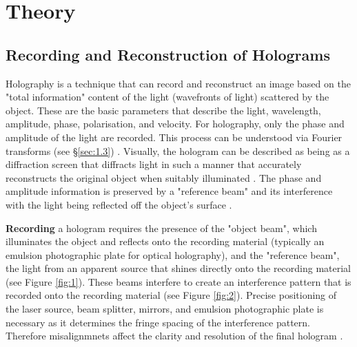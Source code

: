 \documentclass[12pt]{article}
\begin{document}
\begin{abstract}

 
\end{abstract}


\vspace{4cm}

\section{Theory} \label{sec:1}

\subsection{Recording and Reconstruction of Holograms}

Holography is a technique that can record and reconstruct an image based on the "total information" content of the light (wavefronts of light) scattered by the object. These are the basic parameters that describe the light,
wavelength, amplitude, phase, polarisation, and velocity. For holography, only the phase and amplitude of the light are recorded. This process can be understood via Fourier transforms (see §\ref{sec:1.3})
\cite{UCDholo,basicholo1,princetonholo,collier2013optical}.
Visually, the hologram can be described as being as a diffraction screen that diffracts light in such a manner that accurately reconstructs the original object when suitably illuminated
\cite{basicholo1}.
The phase and amplitude information is preserved by a "reference beam" and its interference with the light being reflected off the object's surface
\cite{UCDholo,princetonholo}.

\textbf{Recording} a hologram requires the presence of the "object beam", which illuminates the object and reflects onto the recording material (typically an emulsion photographic plate for optical holography), and the
"reference beam", the light from an apparent source that shines directly onto the recording material
\cite{UCDholo,basicholo1} (see Figure \ref{fig:1}).
These beams interfere to create an interference pattern that is recorded onto the recording material (see Figure \ref{fig:2}). Precise positioning of the laser source, beam splitter, mirrors, and emulsion photographic plate is necessary as it determines the
fringe spacing of the interference pattern. Therefore misalignmnets affect the clarity and resolution of the final hologram
\cite{UCDholo,collier2013optical}.
\end{document}
